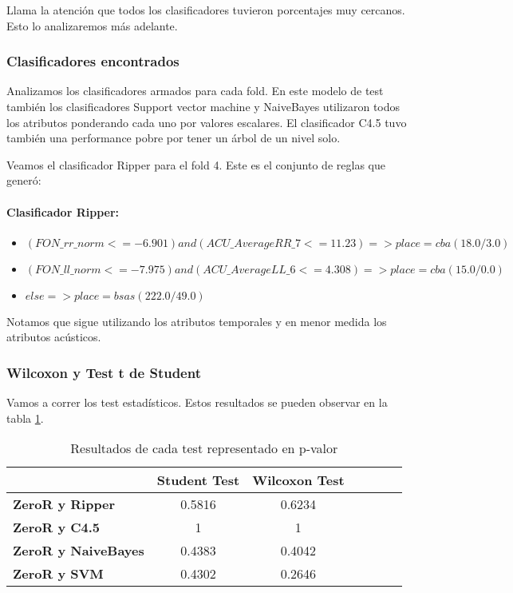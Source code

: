Llama la atención que todos los clasificadores tuvieron porcentajes muy cercanos. Esto lo analizaremos más adelante. 

\subsubsection{Clasificadores encontrados}

Analizamos los clasificadores armados para cada fold. En este modelo de test también los clasificadores Support vector machine y NaiveBayes utilizaron todos los atributos ponderando cada uno por valores escalares. El clasificador C4.5 tuvo también una performance pobre por tener un árbol de un nivel solo. 

Veamos el clasificador Ripper para el fold 4. Este es el conjunto de reglas que generó:
\paragraph*{Clasificador Ripper:}
\begin{flushleft}
	\begin{itemize}
		\item $(FON\_rr\_norm <= -6.901) and (ACU\_AverageRR\_7 <= 11.23) => place=cba (18.0/3.0)$ \\
		\item $(FON\_ll\_norm <= -7.975) and (ACU\_AverageLL\_6 <= 4.308) => place=cba (15.0/0.0)$
		\item $else => place=bsas (222.0/49.0)$
	\end{itemize}
\end{flushleft}

Notamos que sigue utilizando los atributos temporales y en menor medida los atributos acústicos.

\subsubsection{Wilcoxon y Test t de Student}

Vamos a correr los test estadísticos. Estos resultados se pueden observar en la tabla  \ref{res_tests_wilcoxon_student}.

\begin{table}[H]
	\centering
	\begin{tabular}{|l|c|c|c|c|c|c|}
		\hline
		\textbf{}  & \textbf{Student Test} & \textbf{Wilcoxon Test} \\ \hline
		\textbf{ZeroR y Ripper}  & 0.5816 & 0.6234 \\ \hline
		\textbf{ZeroR y C4.5}  & 1 & 1 \\ \hline
		\textbf{ZeroR y NaiveBayes}  & 0.4383 & 0.4042 \\ \hline
		\textbf{ZeroR y SVM}  & 0.4302 & 0.2646 \\ \hline
	\end{tabular}
	\caption{Resultados de cada test representado en p-valor}
	\label{res_tests_wilcoxon_student}
\end{table}

